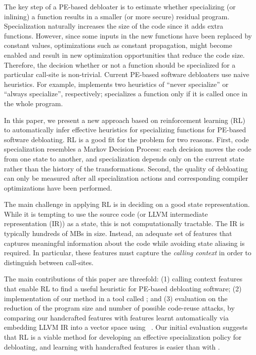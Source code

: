 The key step of a PE-based debloater is to estimate whether specializing (or
inlining) a function results in a smaller (or more secure) residual program.
Specialization naturally increases the size of the code since it adds extra
functions. However, since some inputs in the new functions have been replaced by
constant values, optimizations such as constant propagation, might become
enabled and result in new optimization opportunities that reduce the code size.
Therefore, the decision whether or not a function should be specialized for a
particular call-site is non-trivial. %
Current PE-based software debloaters use naive heuristics. For example, \occam
implements two heuristics of ``never specialize'' or ``always specialize'',
respectively; \trimmer specializes a function only if it is called once in the
whole program. 

In this paper, we present a new approach based on reinforcement
learning (RL) to automatically infer effective heuristics for
specializing functions for PE-based software debloating. RL is a good
fit for the problem for two reasons. First, code specialization
resembles a Markov Decision Process: each decision moves the code from
one state to another, and specialization depends only on the current
state rather than the history of the transformations.  Second, the
quality of debloating can only be measured after all specialization
actions and corresponding compiler optimizations have been
performed. %

The main challenge in applying RL is in deciding on a good state
representation.  While it is tempting to use the source code (or LLVM
intermediate representation (IR)) as a state, this is not
computationally tractable. The IR is typically hundreds of MBs in
size. Instead, an adequate set of features that captures meaningful
information about the code while avoiding state aliasing is
required. In particular, these features must capture the \emph{calling context}
in order to distinguish between call-sites.

The main contributions of this paper are threefold: (1) calling
context features that enable RL to find a useful heuristic for
PE-based debloating software; (2) implementation of our method in a
tool called \doccam; and (3) evaluation on the reduction of the
program size and number of possible code-reuse attacks, by comparing
our handcrafted features with features learnt automatically via
embedding LLVM IR into a vector space using \insttovec~\cite{inst2vec}.
%
Our initial evaluation suggests that RL is a viable method for
developing an effective specialization policy for debloating, and learning with
handcrafted features is easier than with \insttovec.


